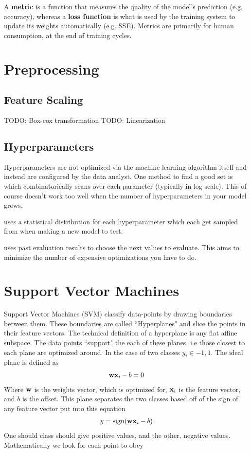 A \textbf{metric} is a function that measures the quality of the model's prediction (e.g. accuracy), whereas a \textbf{loss function} is what is used by the training system to update its weights automatically (e.g. SSE). Metrics are primarily for human consumption, at the end of training cycles.

\section{Preprocessing}

\subsection{Feature Scaling}
 TODO: Box-cox transformation
 TODO: Linearization


\subsection{Hyperparameters}

Hyperparameters are not optimized via the machine learning algorithm itself and instead are configured by the data analyst. One method to find a good set is  which combinatorically scans over each parameter (typically in log scale). This of course doesn't work too well when the number of hyperparameters in your model grows. 

 uses a statistical distribution for each hyperparameter which each get sampled from when making a new model to test.

 uses past evaluation results to choose the next values to evaluate. This aims to minimize the number of expensive optimizations you have to do.





\section{Support Vector Machines}\label{sub:svm}
Support Vector Machines (SVM) classify data-points by drawing boundaries between them. These boundaries are called ``Hyperplanes" and slice the points in their feature vectors. The technical definition of a hyperplane is any flat affine subspace. The data points “support" the each of these planes. i.e those closest to each plane are optimized around. In the case of two classes $y_i \in {-1,1}$. The ideal plane is defined as
\begin{align}
		\textbf{wx}_i-b =0
\end{align}
Where $\textbf{w}$ is the weights vector, which is optimized for, $\textbf{x}_i$ is the feature vector, and $b$ is the offset. This plane separates the two classes based off of the sign of any feature vector put into this equation
\begin{align}
	y = \textrm{sign}(\textbf{wx}_i-b)
\end{align}
One should class should give positive values, and the other, negative values. Mathematically we look for each point to obey

